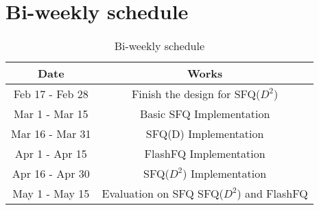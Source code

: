 \section{Bi-weekly schedule}

\begin{table}[t]
	\centering
	\tabcolsep=0.11cm
	\begin{tabular}{|c|c|}
		\hline
		Date & Works  \\
		\hline
		Feb 17 - Feb 28 & Finish the design for SFQ($D^2$) \\
		\hline
		Mar 1 - Mar 15 & Basic SFQ Implementation \\
		\hline
		Mar 16 - Mar 31 & SFQ(D) Implementation \\
		\hline
		Apr 1 - Apr 15  & FlashFQ Implementation \\
		\hline
		Apr 16 - Apr 30  & SFQ($D^2$) Implementation \\
		\hline
		May 1 - May 15  & Evaluation on SFQ SFQ($D^2$) and FlashFQ\\
		\hline
	\end{tabular}
	\caption{Bi-weekly schedule}
	\vspace{-12pt}
	\label{table:traces}
\end{table}
